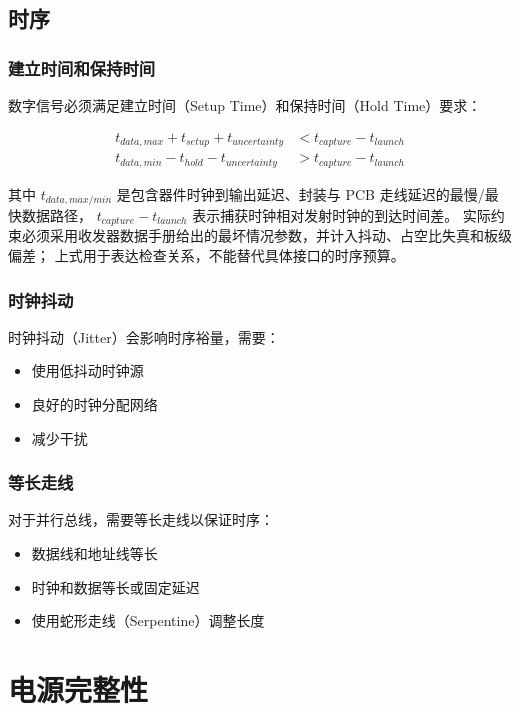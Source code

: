 \subsection{时序}

\subsubsection{建立时间和保持时间}

数字信号必须满足建立时间（Setup Time）和保持时间（Hold Time）要求：

\begin{align}
t_{data,max} + t_{setup} + t_{uncertainty} &< t_{capture} - t_{launch} \label{eq:pcb-setup-time} \\
t_{data,min} - t_{hold} - t_{uncertainty} &> t_{capture} - t_{launch} \label{eq:pcb-hold-time}
\end{align}

其中 $t_{data,max/min}$ 是包含器件时钟到输出延迟、封装与 PCB 走线延迟的最慢/最快数据路径，
$t_{capture}-t_{launch}$ 表示捕获时钟相对发射时钟的到达时间差。
实际约束必须采用收发器数据手册给出的最坏情况参数，并计入抖动、占空比失真和板级偏差；
上式用于表达检查关系，不能替代具体接口的时序预算。

\subsubsection{时钟抖动}

时钟抖动（Jitter）会影响时序裕量，需要：
\begin{itemize}
  \item 使用低抖动时钟源
  \item 良好的时钟分配网络
  \item 减少干扰
\end{itemize}

\subsubsection{等长走线}

对于并行总线，需要等长走线以保证时序：

\begin{itemize}
  \item 数据线和地址线等长
  \item 时钟和数据等长或固定延迟
  \item 使用蛇形走线（Serpentine）调整长度
\end{itemize}

\section{电源完整性}


